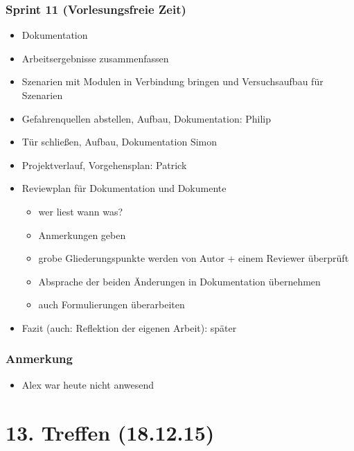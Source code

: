 \subsubsection{Sprint 11 (Vorlesungsfreie Zeit)}
\begin{itemize}
	\item Dokumentation
	\item Arbeitsergebnisse zusammenfassen
	\item Szenarien mit Modulen in Verbindung bringen und Versuchsaufbau für Szenarien
	\item Gefahrenquellen abstellen, Aufbau, Dokumentation: Philip
	\item Tür schließen, Aufbau, Dokumentation Simon
	\item Projektverlauf, Vorgehensplan: Patrick
	\item Reviewplan für Dokumentation und Dokumente
	\begin{itemize}
		\item wer liest wann was?
		\item Anmerkungen geben
		\item grobe Gliederungspunkte werden von Autor + einem Reviewer überprüft
		\item Absprache der beiden \textrightarrow{ }Änderungen in Dokumentation übernehmen
		\item auch Formulierungen überarbeiten
	\end{itemize}
	\item Fazit (auch: Reflektion der eigenen Arbeit): später
\end{itemize}

\subsubsection{Anmerkung}
\begin{itemize}
	\item Alex war heute nicht anwesend
\end{itemize}


\section{13. Treffen (18.12.15)}